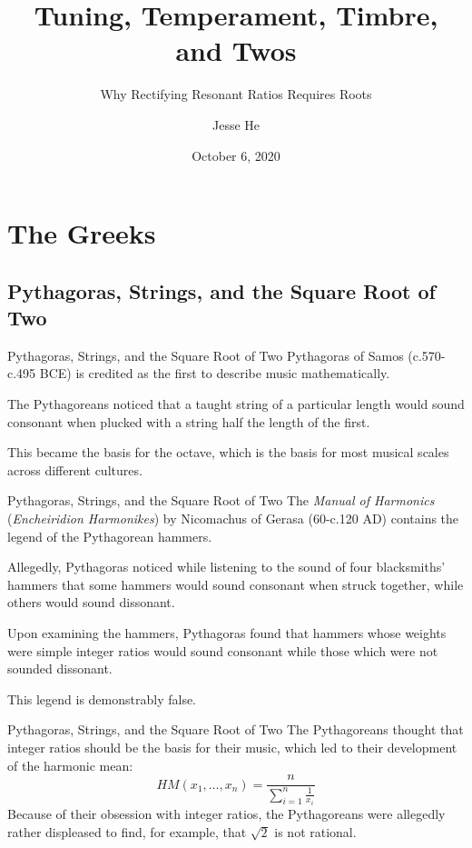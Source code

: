 \documentclass{beamer}
\title{Tuning, Temperament, Timbre, and Twos}
\subtitle{Why Rectifying Resonant Ratios Requires Roots}
\author{Jesse He}
\institute{OSU Reading Classics}
\date{October 6, 2020}
\begin{document}
\frame{\titlepage}

\section{The Greeks}
\subsection{Pythagoras, Strings, and the Square Root of Two}
\begin{frame}{Pythagoras, Strings, and the Square Root of Two}
    \pause Pythagoras of Samos (c.570-c.495 BCE) is credited as the first to describe music mathematically.
    
    \pause The Pythagoreans noticed that a taught string of a particular length would sound consonant when plucked with a string half the length of the first.
    
    \pause This became the basis for the octave, which is the basis for most musical scales across different cultures.
\end{frame}

\begin{frame}{Pythagoras, Strings, and the Square Root of Two}
    \pause The \textit{Manual of Harmonics} (\textit{Encheiridion Harmonikes}) by Nicomachus of Gerasa (60-c.120 AD) contains the legend of the Pythagorean hammers.
    
    \pause Allegedly, Pythagoras noticed while listening to the sound of four blacksmiths' hammers that some hammers would sound consonant when struck together, while others would sound dissonant.
    
    \pause Upon examining the hammers, Pythagoras found that hammers whose weights were simple integer ratios would sound consonant while those which were not sounded dissonant.
    
    \pause This legend is demonstrably false.
\end{frame}

\begin{frame}{Pythagoras, Strings, and the Square Root of Two}
    \pause The Pythagoreans thought that integer ratios should be the basis for their music, which led to their development of the harmonic mean:
    \pause
    \[
        HM(x_1, \dots, x_n) = \dfrac{n}{\sum_{i=1}^n \frac{1}{x_i}}
    \]
    \pause Because of their obsession with integer ratios, the Pythagoreans were allegedly rather displeased to find, for example, that $\sqrt{2}$ is not rational.
\end{frame}
\end{document}
